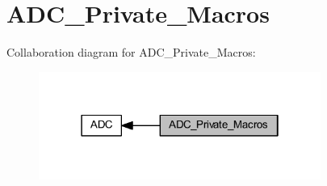 \hypertarget{group___a_d_c___private___macros}{}\section{A\+D\+C\+\_\+\+Private\+\_\+\+Macros}
\label{group___a_d_c___private___macros}
Collaboration diagram for A\+D\+C\+\_\+\+Private\+\_\+\+Macros\+:
\nopagebreak
\begin{figure}[H]
\begin{center}
\leavevmode
\includegraphics[width=262pt]{group___a_d_c___private___macros}
\end{center}
\end{figure}
